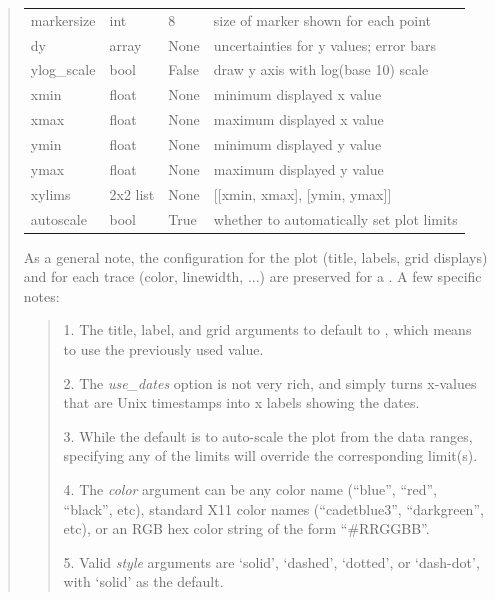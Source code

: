 \documentclass[letterpaper,10pt,english]{sphinxmanual}
\begin{document}
\begin{quote}
\begin{tabulary}{\linewidth}{|L|L|L|L|}
markersize
 & 
int
 & 
8
 & 
size of marker shown for each point
\\

dy
 & 
array
 & 
None
 & 
uncertainties for y values; error bars
\\

ylog\_scale
 & 
bool
 & 
False
 & 
draw y axis with log(base 10) scale
\\

xmin
 & 
float
 & 
None
 & 
minimum displayed x value
\\

xmax
 & 
float
 & 
None
 & 
maximum displayed x value
\\

ymin
 & 
float
 & 
None
 & 
minimum displayed y value
\\

ymax
 & 
float
 & 
None
 & 
maximum displayed y value
\\

xylims
 & 
2x2 list
 & 
None
 & 
{[}{[}xmin, xmax{]}, {[}ymin, ymax{]}{]}
\\

autoscale
 & 
bool
 & 
True
 & 
whether to automatically set plot limits
\\
\hline
\end{tabulary}


As a general note, the configuration for the plot (title, labels, grid
displays) and for each trace (color, linewidth, ...) are preserved for a
{\hyperref[plotpanel:PlotPanel]{}}. A few specific notes:
\begin{quote}

1. The title, label, and grid arguments to {\hyperref[plotpanel:plot]{}} default to ,
which means to use the previously used value.

2. The \emph{use\_dates} option is not very rich, and simply turns x-values that
are Unix timestamps into x labels showing the dates.

3. While the default is to auto-scale the plot from the data ranges,
specifying any of the limits will override the corresponding limit(s).

4. The \emph{color} argument can be any color name (``blue'', ``red'', ``black'', etc),
standard X11 color names (``cadetblue3'', ``darkgreen'', etc), or an RGB hex
color string of the form ``\#RRGGBB''.

5. Valid \emph{style} arguments are `solid', `dashed', `dotted', or `dash-dot',
with `solid' as the default.


\end{quote}
\end{quote}
\end{document}
